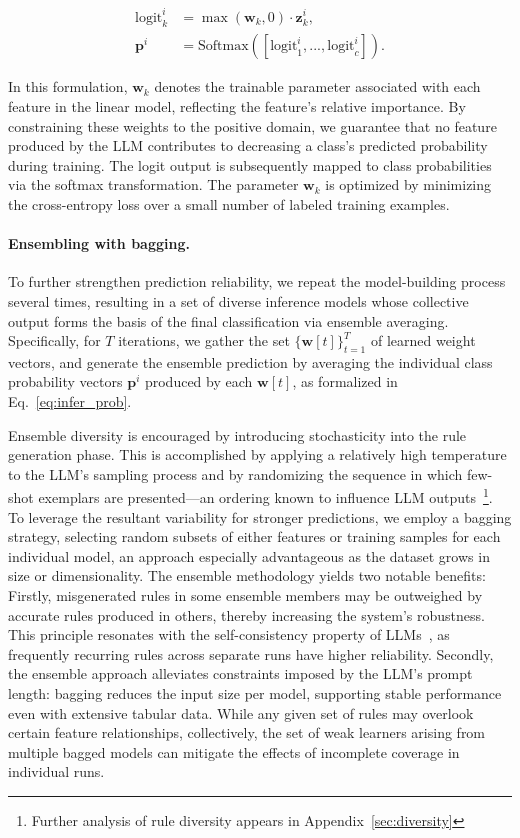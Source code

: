 \begin{align}
\text{logit}_k^i &= \max(\mathbf{w}_k, 0) \cdot \mathbf{z}_k^i, \nonumber \\
\mathbf{p}^i &= \text{Softmax}({[\text{logit}_{1}^i, ..., \text{logit}_{c}^i]}). \label{eq:infer_prob}
\end{align}

In this formulation, $\mathbf{w}_k$ denotes the trainable parameter associated with each feature in the linear model, reflecting the feature’s relative importance. By constraining these weights to the positive domain, we guarantee that no feature produced by the LLM contributes to decreasing a class’s predicted probability during training. The logit output is subsequently mapped to class probabilities via the softmax transformation. The parameter $\mathbf{w}_k$ is optimized by minimizing the cross-entropy loss over a small number of labeled training examples.

\vspace*{-0.12in}
\paragraph{Ensembling with bagging.} To further strengthen prediction reliability, we repeat the model-building process several times, resulting in a set of diverse inference models whose collective output forms the basis of the final classification via ensemble averaging. Specifically, for $T$ iterations, we gather the set $\{\mathbf{w}[t]\}_{t=1}^T$ of learned weight vectors, and generate the ensemble prediction by averaging the individual class probability vectors $\mathbf{p}^i$ produced by each $\mathbf{w}[t]$, as formalized in Eq.~\ref{eq:infer_prob}.

Ensemble diversity is encouraged by introducing stochasticity into the rule generation phase. This is accomplished by applying a relatively high temperature to the LLM’s sampling process and by randomizing the sequence in which few-shot exemplars are presented—an ordering known to influence LLM outputs~\cite{lu2022fantastically}\footnote{Further analysis of rule diversity appears in Appendix~\ref{sec:diversity}}. To leverage the resultant variability for stronger predictions, we employ a bagging strategy, selecting random subsets of either features or training samples for each individual model, an approach especially advantageous as the dataset grows in size or dimensionality. The ensemble methodology yields two notable benefits: Firstly, misgenerated rules in some ensemble members may be outweighed by accurate rules produced in others, thereby increasing the system’s robustness. This principle resonates with the self-consistency property of LLMs~\cite{wang2022self}, as frequently recurring rules across separate runs have higher reliability. Secondly, the ensemble approach alleviates constraints imposed by the LLM’s prompt length: bagging reduces the input size per model, supporting stable performance even with extensive tabular data. While any given set of rules may overlook certain feature relationships, collectively, the set of weak learners arising from multiple bagged models can mitigate the effects of incomplete coverage in individual runs.

